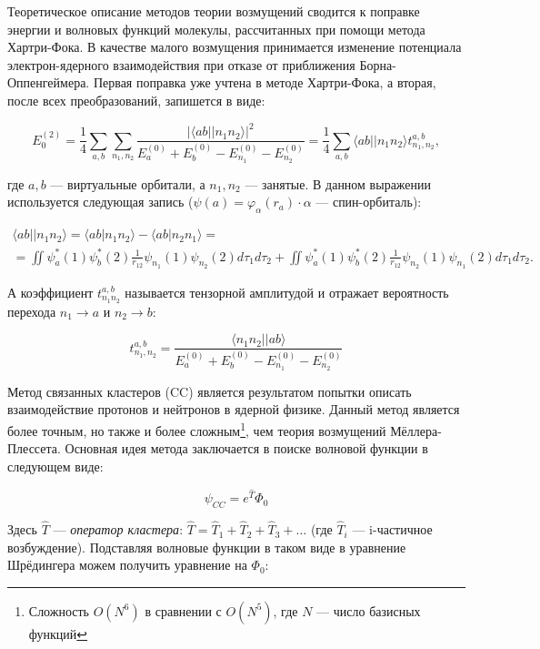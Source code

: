 \documentclass[a4paper,12pt]{article}
\newcommand{\rarr}{\rightarrow}
\begin{document}
\begin{onehalfspace}
	Теоретическое описание методов теории возмущений сводится к поправке энергии и волновых функций молекулы, рассчитанных при помощи метода Хартри-Фока. В качестве малого возмущения принимается изменение потенциала электрон-ядерного взаимодействия при отказе от приближения Борна-Оппенгеймера. Первая поправка уже учтена в методе Хартри-Фока, а вторая, после всех преобразований, запишется в виде:
	
	\begin{equation}
		\label{eq_mp2}
		{ E_0^{(2)} = \frac14 \sum_{a,b} \sum_{n_1, n_2} \frac{|\langle ab||n_1n_2\rangle|^2}{E_a^{(0)} + E_b^{(0)} - E_{n_1}^{(0)} - E_{n_2}^{(0)}} = \frac14\sum_{a,b} \langle ab||n_1n_2\rangle t_{n_1, n_2}^{a, b} },
	\end{equation}
	
	где $a,b$ — виртуальные орбитали, а $n_1, n_2$ — занятые. В данном выражении используется следующая запись ($\psi (a)  = \varphi_\alpha (r_a)\cdot \alpha$ — спин-орбиталь):
	
	\begin{multline}
		\langle ab||n_1n_2\rangle = \langle ab|n_1n_2\rangle - \langle ab|n_2n_1\rangle = \\
		= \iint \psi^*_a(1)\psi_b^*(2)\frac1{r_{12}} \psi_{n_1}(1)\psi_{n_2}(2) d\tau_1 d\tau_2 + \iint \psi^*_a(1)\psi_b^*(2)\frac1{r_{12}} \psi_{n_2}(1)\psi_{n_1}(2) d\tau_1 d\tau_2.
	\end{multline}
	
	А коэффициент $t_{n_1n_2}^{a,b}$ называется тензорной амплитудой и отражает вероятность перехода $n_1\rarr a$ и $n_2 \rarr b$:
	
	\begin{equation}
		\label{eq_tensor_amp}
		t_{n_1, n_2}^{a,b} = \frac{\langle n_1n_2||ab\rangle}{E_a^{(0)} + E_b^{(0)} - E_{n_1}^{(0)} - E_{n_2}^{(0)}}
	\end{equation}
	
	Метод связанных кластеров (CC) является результатом попытки описать взаимодействие протонов и нейтронов в ядерной физике. Данный метод является более точным, но также и более сложным\footnote{Сложность $O(N^6)$ в сравнении с $O(N^5)$, где $N$ — число базисных функций}, чем теория возмущений Мёллера-Плессета. Основная идея метода заключается в поиске волновой функции в следующем виде:
	
	\begin{equation}
		\psi_{CC} = e^{\hat T} \Phi_0
	\end{equation}
	
	Здесь $\hat T$ — \textit{оператор кластера}: $\hat T = \hat T_1 + \hat T_2 + \hat T_3 + \dots $ (где $\hat T_i$ — i-частичное возбуждение). Подставляя волновые функции в таком виде в уравнение Шрёдингера можем получить уравнение на $\Phi_0$:
	

\end{onehalfspace}
\end{document}
